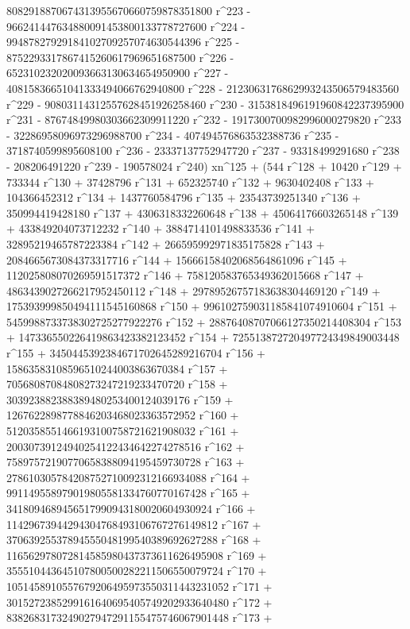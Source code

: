        8082918870674313955670660759878351800 r^223 - 
       966241447634880091453800133778727600 r^224 - 
       99487827929184102709257074630544396 r^225 - 
       8752293317867415260617969651687500 r^226 - 
       652310232020093663130634654950900 r^227 - 
       40815836651041333494066762940800 r^228 - 
       2123063176862993243506579483560 r^229 - 
       90803114312557628451926258460 r^230 - 
       3153818496191960842237395900 r^231 - 
       87674849980303662309911220 r^232 - 
       1917300700982996000279820 r^233 - 
       32286958096973296988700 r^234 - 407494576863532388736 r^235 - 
       3718740599895608100 r^236 - 23337137752947720 r^237 - 
       93318499291680 r^238 - 208206491220 r^239 - 
       190578024 r^240) xn^125 + (544 r^128 + 10420 r^129 + 
       733344 r^130 + 37428796 r^131 + 652325740 r^132 + 
       9630402408 r^133 + 104366452312 r^134 + 1437760584796 r^135 + 
       23543739251340 r^136 + 350994419428180 r^137 + 
       4306318332260648 r^138 + 45064176603265148 r^139 + 
       433849204073712232 r^140 + 3884714101498833536 r^141 + 
       32895219465787223384 r^142 + 266595992971835175828 r^143 + 
       2084665673084373317716 r^144 + 15666158402068564861096 r^145 + 
       112025808070269591517372 r^146 + 
       758120583765349362015668 r^147 + 
       4863439027266217952450112 r^148 + 
       29789526757183638304469120 r^149 + 
       175393999850494111545160868 r^150 + 
       996102759031185841074910604 r^151 + 
       5459988733738302725277922276 r^152 + 
       28876408707066127350214408304 r^153 + 
       147336550226419863423382123452 r^154 + 
       725513872720497724349849003448 r^155 + 
       3450445392384671702645289216704 r^156 + 
       15863583108596510244003863670384 r^157 + 
       70568087084808273247219233470720 r^158 + 
       303923882388389480253400124039176 r^159 + 
       1267622898778846203468023363572952 r^160 + 
       5120358551466193100758721621908032 r^161 + 
       20030739124940254122434642274278516 r^162 + 
       75897572190770658388094195459730728 r^163 + 
       278610305784208752710092312166934088 r^164 + 
       991149558979019805581334760770167428 r^165 + 
       3418094689456517990943180020604930924 r^166 + 
       11429673944294304768493106767276149812 r^167 + 
       37063925537894555048199540389692627288 r^168 + 
       116562978072814585980437373611626495908 r^169 + 
       355510443645107800500282211506550079724 r^170 + 
       1051458910557679206495973550311443231052 r^171 + 
       3015272385299161640695405749202933640480 r^172 + 
       8382683173249027947291155475746067901448 r^173 + 
